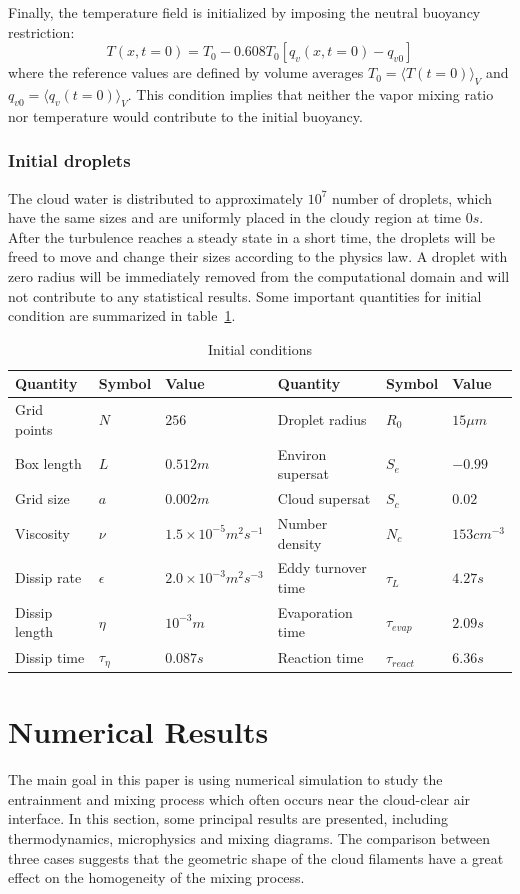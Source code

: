 \documentclass[12pt]{article}
\begin{document}
Finally, the temperature field is initialized by imposing the neutral buoyancy restriction:
\begin{equation}
T(x,t = 0) = T_0 - 0.608T_0[q_v(x,t = 0) - q_{v0}]
\end{equation}
where the reference values are defined by volume averages $T_0 = \langle T(t=0)\rangle_V$ and $q_{v0} = \langle q_v(t=0)\rangle_V$. This condition implies that neither the vapor mixing ratio nor temperature would contribute to the initial buoyancy.  
\subsubsection{Initial droplets}

The cloud water is distributed to approximately $10^{7}$ number of droplets, which have the same sizes and are uniformly placed in the cloudy region at time $0s$. After the turbulence reaches a steady state in a short time, the droplets will be freed to move and change their sizes according to the physics law. A droplet with zero radius will be immediately removed from the computational domain and will not contribute to any statistical results. Some important quantities for initial condition are summarized in table~\ref{tb:parameters}.
\begin{table}
\begin{tabular}{llllll}
\hline\hline
Quantity & Symbol & Value & Quantity & Symbol & Value\tabularnewline
\hline
Grid points & $N$ & $256$ & Droplet radius & $R_{0}$ & $15\mu m$\tabularnewline
\hline 
Box length & $L$ & $0.512m$ & Environ supersat & $S_{e}$ & $-0.99$\tabularnewline
\hline 
Grid size & $a$ & $0.002m$ & Cloud supersat & $S_{c}$ & $0.02$\tabularnewline
\hline 
Viscosity & $\nu$ & $1.5\times10^{-5}m^{2}s^{-1}$ & Number density& $N_{c}$ & $153cm^{-3}$\tabularnewline
\hline 
Dissip rate& $\epsilon$ & $2.0\times10^{-3}m^{2}s^{-3}$ & Eddy turnover time & $\tau_{L}$ & $4.27s$\tabularnewline
\hline 
Dissip length& $\eta$ & $10^{-3}m$ & Evaporation time & $\tau_{evap}$ & $2.09s$\tabularnewline
\hline 
Dissip time& $\tau_{\eta}$ & $0.087s$ & Reaction time & $\tau_{react}$ & $6.36s$\tabularnewline
\hline 
\end{tabular}
\caption{Initial conditions}\label{tb:parameters}
\end{table}
 
\section{Numerical Results}
The main goal in this paper is using numerical simulation to study
the entrainment and mixing process which often occurs near the cloud-clear air interface. In this section, some principal results are presented, including thermodynamics, microphysics and mixing diagrams. The comparison between three cases suggests that the geometric shape of the cloud filaments have a great effect on the homogeneity of the mixing process.
\end{document}
